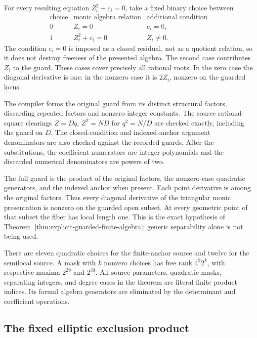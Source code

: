 For every resulting equation $Z_i^2+c_i=0$, take a fixed binary
choice between
\[
 \begin{array}{c|c|c}
 \text{choice}&\text{monic algebra relation}&\text{additional condition}\\ \hline
 0&Z_i=0&c_i=0,\\
 1&Z_i^2+c_i=0&Z_i\ne0.
 \end{array}
\]
The condition $c_i=0$ is imposed as a closed residual, not as a
quotient relation, so it does not destroy freeness of the
presented algebra.  The second case contributes $Z_i$ to the
guard.  These cases cover precisely all rational roots.  In the
zero case the diagonal derivative is one; in the nonzero case it
is $2Z_i$, nonzero on the guarded locus.

The compiler forms the original guard from its distinct
structural factors, discarding repeated factors and nonzero
integer constants.  The source rational-square clearings $Z=Dq$,
$Z^2=ND$ for $q^2=N/D$ are checked exactly, including the
guard on $D$.  The closed-condition and indexed-anchor argument
denominators are also checked against the recorded guards.
After the substitutions, the
coefficient numerators are integer polynomials and the discarded
numerical denominators are powers of two.

The full guard is the product of the original factors, the
nonzero-case quadratic generators, and the indexed anchor when
present.  Each point derivative is among the original factors.
Thus every diagonal derivative of the triangular monic
presentation is nonzero on the guarded open subset.  At every
geometric point of that subset the fiber has local length one.
This is the exact hypothesis of
Theorem~\ref{thm:explicit-guarded-finite-algebra}; generic
separability alone is not being used.

There are eleven quadratic choices for the finite-anchor source
and twelve for the semilocal source.  A mask with $k$ nonzero
choices has free rank $4^9 2^k$, with respective maxima $2^{29}$
and $2^{30}$.  All source parameters, quadratic masks, separating
integers, and degree cases in the theorem are literal finite
product indices.  Its formal algebra generators are eliminated
by the determinant and coefficient operations.

\subsection{The fixed elliptic exclusion product}

